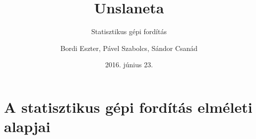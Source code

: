 \documentclass{beamer}
\title{Unslaneta}
\subtitle{Statisztikus gépi fordítás}
\author{Bordi Eszter, Pável Szabolcs, Sándor Csanád}
\institute[Babe\c{s}-Bolyai Tudományegyetem] %
{Babe\c{s}-Bolyai Tudományegyetem, Matematika és Informatika Kar, Kolozsvár}
\date{2016. június 23.}
\begin{document}




\section[Bevezető]{A statisztikus gépi fordítás  elméleti alapjai}





%
%
%
%
%
\end{document}
